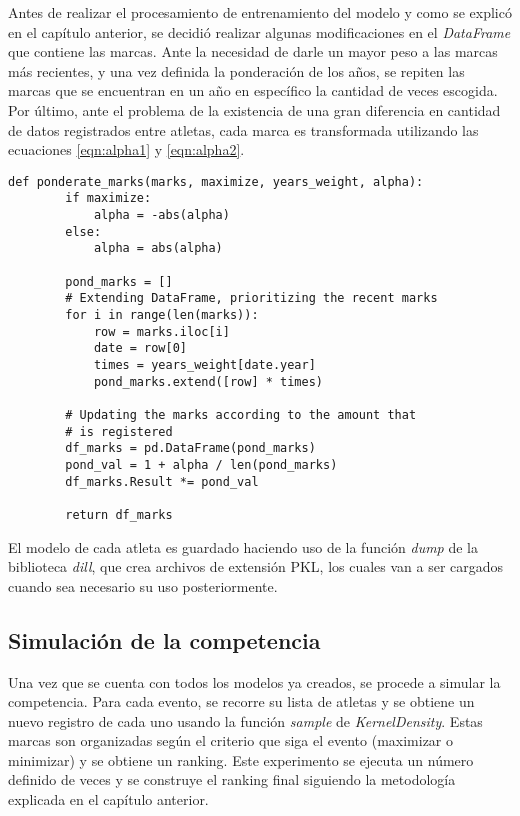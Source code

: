 Antes de realizar el procesamiento de entrenamiento del modelo y como se explicó en el capítulo anterior, se decidió realizar algunas modificaciones en el \textit{DataFrame} que contiene las marcas. Ante la necesidad de darle un mayor peso a las marcas más recientes, y una vez definida la ponderación de los años, se repiten las marcas que se encuentran en un año en específico la cantidad de veces escogida. Por último, ante el problema de la existencia de una gran diferencia en cantidad de datos registrados entre atletas, cada marca es transformada utilizando las ecuaciones \ref{eqn:alpha1} y \ref{eqn:alpha2}. 

\begin{lstlisting}[caption= Actualización de los valores de las marcas de un atleta según la cantidad que tiene registradas y la ponderación de los años, label = code:ponderation]
    def ponderate_marks(marks, maximize, years_weight, alpha):
        if maximize:
            alpha = -abs(alpha)
        else:
            alpha = abs(alpha)

        pond_marks = []
        # Extending DataFrame, prioritizing the recent marks
        for i in range(len(marks)):
            row = marks.iloc[i]
            date = row[0]
            times = years_weight[date.year]
            pond_marks.extend([row] * times)

        # Updating the marks according to the amount that
        # is registered
        df_marks = pd.DataFrame(pond_marks)
        pond_val = 1 + alpha / len(pond_marks)
        df_marks.Result *= pond_val
            
        return df_marks
\end{lstlisting}

El modelo de cada atleta es guardado haciendo uso de la función \textit{dump} de la biblioteca \textit{dill}, que crea archivos de extensión PKL, los cuales van a ser cargados cuando sea necesario su uso posteriormente.

\subsection{Simulación de la competencia}\label{section:simcomp}

Una vez que se cuenta con todos los modelos ya creados, se procede a simular la competencia. Para cada evento, se recorre su lista de atletas y se obtiene un nuevo registro de cada uno usando la función \textit{sample} de \textit{KernelDensity}. Estas marcas son organizadas según el criterio que siga el evento (maximizar o minimizar) y se obtiene un ranking. Este experimento se ejecuta un número definido de veces y se construye el ranking final siguiendo la metodología explicada en el capítulo anterior. 

